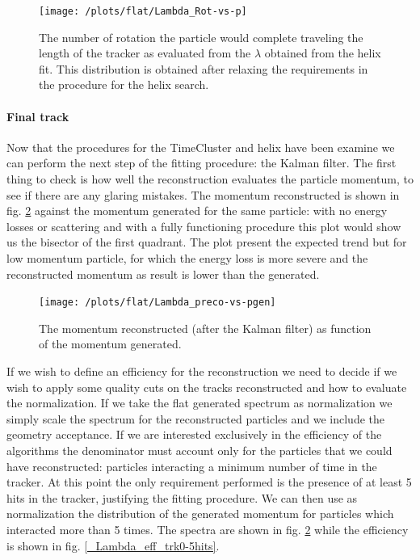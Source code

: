 \documentclass[12pt,a4paper,openright, oneside, titlepage]{book} %
\begin{document}
\begin{figure}[h!]
\centering
\texttt{[image: /plots/flat/Lambda\_Rot-vs-p]}
\caption{The number of rotation the particle would complete traveling the length of the tracker as evaluated from the $\lambda$ obtained from the helix fit. This distribution is obtained after relaxing the requirements in the procedure for the helix search.}
\label{_Lambda_Rot-vs-p}
\end{figure}

\paragraph{Final track}
Now that the procedures for the TimeCluster and helix have been examine we can perform the next step of the fitting procedure: the Kalman filter. 
The first thing to check is how well the reconstruction evaluates the particle momentum, to see if there are any glaring mistakes. 
The momentum reconstructed is shown in fig. \ref{_Lambda_preco-vs-pgen} against the momentum generated for the same particle: with no energy losses or scattering and with a fully functioning procedure this plot would show us the bisector of the first quadrant. 
The plot present the expected trend but for low momentum particle, for which the energy loss is more severe and the reconstructed momentum as result is lower than the generated. \\

\begin{figure}[h!]
\centering
\texttt{[image: /plots/flat/Lambda\_preco-vs-pgen]}
\caption{The momentum reconstructed (after the Kalman filter) as function of the momentum generated.}
\label{_Lambda_preco-vs-pgen}
\end{figure}

\noindent If we wish to define an efficiency for the reconstruction we need to decide if we wish to apply some quality cuts on the tracks reconstructed and how to evaluate the normalization. 
If we take the flat generated spectrum as normalization we simply scale the spectrum for the reconstructed particles and we include the geometry acceptance. 
If we are interested exclusively in the efficiency of the algorithms the denominator must account only for the particles that we could have reconstructed: particles interacting a minimum number of time in the tracker. 
At this point the only requirement performed is the presence of at least 5 hits in the tracker, justifying the fitting procedure. 
We can then use as normalization the distribution of the generated momentum for particles which interacted more than 5 times. 
The spectra are shown in fig. \ref{_Lambda_preco-vs-pgen} while the efficiency is shown in fig. \ref{_Lambda_eff_trk0-5hits}.
\end{document}

